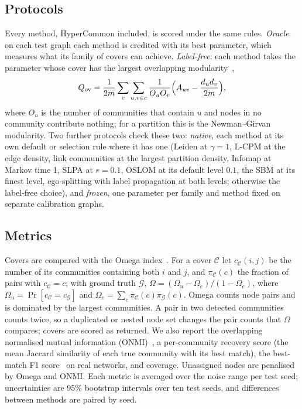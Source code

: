 \subsection{Protocols}
\label{sec:protocols}

Every method, HyperCommon included, is scored under the same rules. \emph{Oracle}: on
each test graph each method is credited with its best parameter, which measures what
its family of covers can achieve. \emph{Label-free}: each method takes the parameter
whose cover has the largest overlapping modularity~\cite{shen2009detect},
\begin{equation}
  Q_{\rm ov}=\frac{1}{2m}\sum_{c}\sum_{u,v\in c}\frac{1}{O_uO_v}
  \Bigl(A_{uv}-\frac{d_ud_v}{2m}\Bigr),
  \label{eq:qov}
\end{equation}
where $O_u$ is the number of communities that contain $u$ and nodes in no community
contribute nothing; for a partition this is the Newman--Girvan modularity. Two further
protocols check these two: \emph{native}, each method at its own default or selection
rule where it has one (Leiden at $\gamma=1$, L-CPM at the edge density, link communities
at the largest partition density, Infomap at Markov time 1, SLPA at $r=0.1$, OSLOM at its
default level $0.1$, the SBM at its finest level, ego-splitting with label propagation
at both levels; otherwise the label-free choice), and \emph{frozen}, one parameter per
family and method fixed on separate calibration graphs.

\subsection{Metrics}
\label{sec:metrics}

Covers are compared with the Omega index~\cite{collins1988omega}. For a cover
$\mathcal C$ let $c_{\mathcal C}(i,j)$ be the number of its communities containing both
$i$ and $j$, and $\pi_{\mathcal C}(c)$ the fraction of pairs with $c_{\mathcal C}=c$;
with ground truth $\mathcal G$, $\Omega=(\Omega_u-\Omega_e)/(1-\Omega_e)$, where
$\Omega_u=\Pr[c_{\mathcal C}=c_{\mathcal G}]$ and
$\Omega_e=\sum_c\pi_{\mathcal C}(c)\pi_{\mathcal G}(c)$. Omega counts node pairs and is
dominated by the largest communities. A pair in two detected communities counts twice, so a duplicated or nested node set changes the pair counts that $\Omega$ compares; covers are scored as returned. We also report the overlapping normalised
mutual information (ONMI)~\cite{mcdaid2011normalized}, a per-community recovery score
(the mean Jaccard similarity of each true community with its best match), the best-match
F1 score~\cite{yang2015defining} on real networks, and coverage. Unassigned nodes are
penalised by Omega and ONMI. Each metric is averaged over the noise range per test seed;
uncertainties are 95\% bootstrap intervals over ten test seeds, and differences between
methods are paired by seed.
